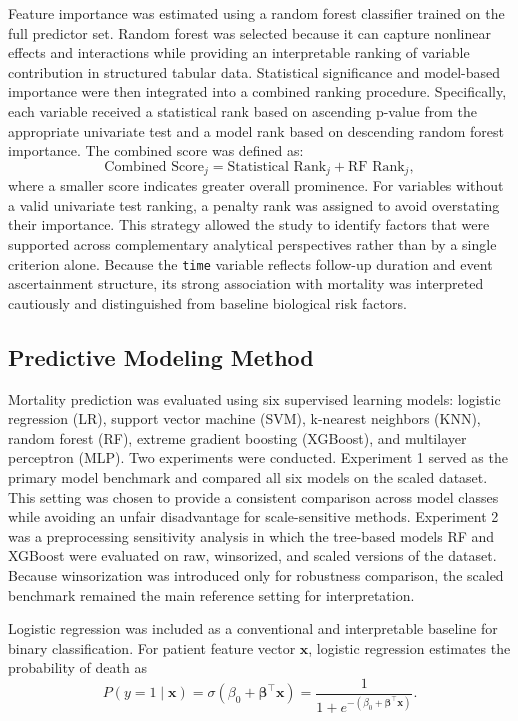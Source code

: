 Feature importance was estimated using a random forest classifier trained on the full predictor set. Random forest was selected because it can capture nonlinear effects and interactions while providing an interpretable ranking of variable contribution in structured tabular data. Statistical significance and model-based importance were then integrated into a combined ranking procedure. Specifically, each variable received a statistical rank based on ascending p-value from the appropriate univariate test and a model rank based on descending random forest importance. The combined score was defined as:
\begin{equation}
\text{Combined Score}_j = \text{Statistical Rank}_j + \text{RF Rank}_j,
\end{equation}
where a smaller score indicates greater overall prominence. For variables without a valid univariate test ranking, a penalty rank was assigned to avoid overstating their importance. This strategy allowed the study to identify factors that were supported across complementary analytical perspectives rather than by a single criterion alone. Because the \texttt{time} variable reflects follow-up duration and event ascertainment structure, its strong association with mortality was interpreted cautiously and distinguished from baseline biological risk factors.

\subsection{Predictive Modeling Method}
Mortality prediction was evaluated using six supervised learning models: logistic regression (LR), support vector machine (SVM), k-nearest neighbors (KNN), random forest (RF), extreme gradient boosting (XGBoost), and multilayer perceptron (MLP). Two experiments were conducted. Experiment 1 served as the primary model benchmark and compared all six models on the scaled dataset. This setting was chosen to provide a consistent comparison across model classes while avoiding an unfair disadvantage for scale-sensitive methods. Experiment 2 was a preprocessing sensitivity analysis in which the tree-based models RF and XGBoost were evaluated on raw, winsorized, and scaled versions of the dataset. Because winsorization was introduced only for robustness comparison, the scaled benchmark remained the main reference setting for interpretation.

Logistic regression was included as a conventional and interpretable baseline for binary classification. For patient feature vector $\mathbf{x}$, logistic regression estimates the probability of death as
\begin{equation}
P(y=1 \mid \mathbf{x}) = \sigma(\beta_0 + \boldsymbol{\beta}^{\top}\mathbf{x}) = \frac{1}{1 + e^{-(\beta_0 + \boldsymbol{\beta}^{\top}\mathbf{x})}}.
\end{equation}

